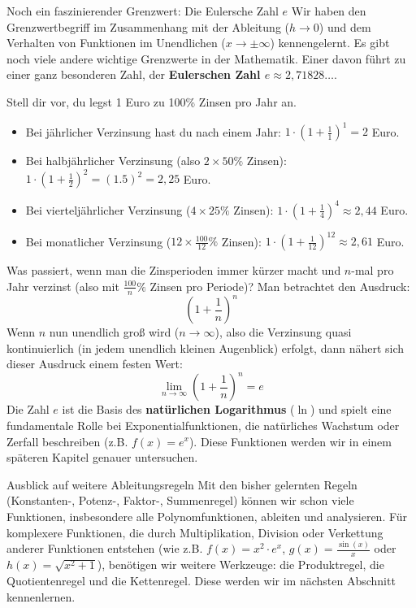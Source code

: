 \begin{infoboxumgebung}{Noch ein faszinierender Grenzwert: Die Eulersche Zahl $e$}
Wir haben den Grenzwertbegriff im Zusammenhang mit der Ableitung ($h \to 0$) und dem Verhalten von Funktionen im Unendlichen ($x \to \pm\infty$) kennengelernt. Es gibt noch viele andere wichtige Grenzwerte in der Mathematik. Einer davon führt zu einer ganz besonderen Zahl, der \textbf{Eulerschen Zahl $e \approx 2,71828\dots$}.

Stell dir vor, du legst 1 Euro zu 100\% Zinsen pro Jahr an.
\begin{itemize}
    \item Bei jährlicher Verzinsung hast du nach einem Jahr: $1 \cdot (1 + \frac{1}{1})^1 = 2$ Euro.
    \item Bei halbjährlicher Verzinsung (also $2 \times 50\%$ Zinsen): $1 \cdot (1 + \frac{1}{2})^2 = (1.5)^2 = 2,25$ Euro.
    \item Bei vierteljährlicher Verzinsung ($4 \times 25\%$ Zinsen): $1 \cdot (1 + \frac{1}{4})^4 \approx 2,44$ Euro.
    \item Bei monatlicher Verzinsung ($12 \times \frac{100}{12}\%$ Zinsen): $1 \cdot (1 + \frac{1}{12})^{12} \approx 2,61$ Euro.
\end{itemize}
Was passiert, wenn man die Zinsperioden immer kürzer macht und $n$-mal pro Jahr verzinst (also mit $\frac{100}{n}\%$ Zinsen pro Periode)? Man betrachtet den Ausdruck:
\[ \left(1 + \frac{1}{n}\right)^n \]
Wenn $n$ nun unendlich groß wird ($n \to \infty$), also die Verzinsung quasi kontinuierlich (in jedem unendlich kleinen Augenblick) erfolgt, dann nähert sich dieser Ausdruck einem festen Wert:
\[ \lim_{n \to \infty} \left(1 + \frac{1}{n}\right)^n = e \]
Die Zahl $e$ ist die Basis des \textbf{natürlichen Logarithmus} ($\ln$) und spielt eine fundamentale Rolle bei Exponentialfunktionen, die natürliches Wachstum oder Zerfall beschreiben (z.B. $f(x) = e^x$). Diese Funktionen werden wir in einem späteren Kapitel genauer untersuchen.
\end{infoboxumgebung}

\begin{infoboxumgebung}{Ausblick auf weitere Ableitungsregeln}
Mit den bisher gelernten Regeln (Konstanten-, Potenz-, Faktor-, Summenregel) können wir schon viele Funktionen, insbesondere alle Polynomfunktionen, ableiten und analysieren. Für komplexere Funktionen, die durch Multiplikation, Division oder Verkettung anderer Funktionen entstehen (wie z.B. $f(x) = x^2 \cdot e^x$, $g(x) = \frac{\sin(x)}{x}$ oder $h(x) = \sqrt{x^2+1}$), benötigen wir weitere Werkzeuge: die Produktregel, die Quotientenregel und die Kettenregel. Diese werden wir im nächsten Abschnitt kennenlernen.
\end{infoboxumgebung}

